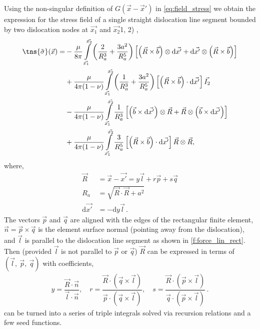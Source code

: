 Using the non-singular definition of $ G(\vec{x}-\vec{x}') $ in \cref{eq:field_stress} we obtain the expression for the stress field of a single straight dislocation line segment bounded by two dislocation nodes at $\vec{x_1}$ and $\vec{x_2}$1, 2) \cite{a_non-singular_continuum_theory_of_dislocations},
\begin{align}
    \label{eq:stressIntro}
    \tns{\tilde{\sigma}}(\vec{x}) = &
    - \dfrac{\mu}{8\pi} \int\limits_{\vec{x_1}}^{\vec{x_2}} \left( \dfrac{2}{R_{a}^{3}} + \dfrac{3a^2}{R_{a}^{5}} \right) \left[ \left(\vec{R} \times \vec{b}\right) \otimes \mathrm{d}\vec{x'} + \mathrm{d}\vec{x'} \otimes \left(\vec{R} \times \vec{b}\right) \right]          \\
                                    & + \dfrac{\mu}{4\pi(1-\nu)} \int\limits_{\vec{x_1}}^{\vec{x_2}} \left( \dfrac{1}{R_{a}^{3}} + \dfrac{3a^2}{R_{a}^{5}} \right) \left[ \left(\vec{R} \times \vec{b}\right) \cdot \mathrm{d}\vec{x'} \right]\vec{I_2}\nonumber                  \\
                                    & -\dfrac{\mu}{4\pi(1-\nu)} \int\limits_{\vec{x_1}}^{\vec{x_2}}  \dfrac{1}{R_{a}^{3}} \left[ \left(\vec{b} \times \mathrm{d}\vec{x'}\right) \otimes \vec{R} + \vec{R} \otimes \left(\vec{b} \times \mathrm{d}\vec{x'}\right) \right]\nonumber \\
                                    & + \dfrac{\mu}{4\pi(1-\nu)} \int\limits_{\vec{x_1}}^{\vec{x_2}} \dfrac{3}{R_{a}^{5}} \left[ \left(\vec{R} \times \vec{b}\right) \cdot \mathrm{d}\vec{x'} \right]\vec{R}\otimes\vec{R}\nonumber,
\end{align}
where,
\begin{align}
    \vec{R}            & = \vec{x} - \vec{x'} = y \vec{l} + r \vec{p} + s \vec{q} \\
    R_a                & = \sqrt{\vec{R} \cdot \vec{R} + a^2}                     \\
    \mathrm{d}\vec{x'} & = -\mathrm{d} y \vec{l}\,.
\end{align}
The vectors $\vec{p}$ and $\vec{q}$ are aligned with the edges of the rectangular finite element, $\vec{n} = \vec{p} \times \vec{q}$ is the element surface normal (pointing away from the dislocation), and $\vec{l}$ is parallel to the dislocation line segment as shown in \cref{f:force_lin_rect}. Then (provided $\vec{l}$ is not parallel to $\vec{p}$ or $\vec{q}$) $\vec{R}$ can be expressed in terms of $(\vec{l},~\vec{p},~\vec{q})$ with coefficients,
\begin{align}
    y = \dfrac{\vec{R}\cdot \vec{n}}{\vec{l}\cdot \vec{n}} \label{eq:problemIntro},\quad
    r = \dfrac{\vec{R}\cdot (\vec{q} \times \vec{l})}{\vec{p}\cdot (\vec{q} \times \vec{l})}, \quad
    s = \dfrac{\vec{R}\cdot (\vec{p} \times \vec{l})}{\vec{q}\cdot (\vec{p} \times \vec{l})}\,.
\end{align}
 can be turned into a series of triple integrals solved via recursion relations and a few seed functions.

